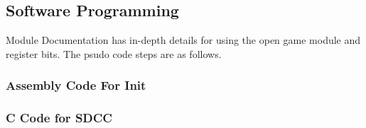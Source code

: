 \subsection{Software Programming}
\par
Module Documentation has in-depth details for using the open game module and register bits. The psudo code steps are as follows.


\subsubsection{Assembly Code For Init}

\subsubsection{C Code for SDCC}

